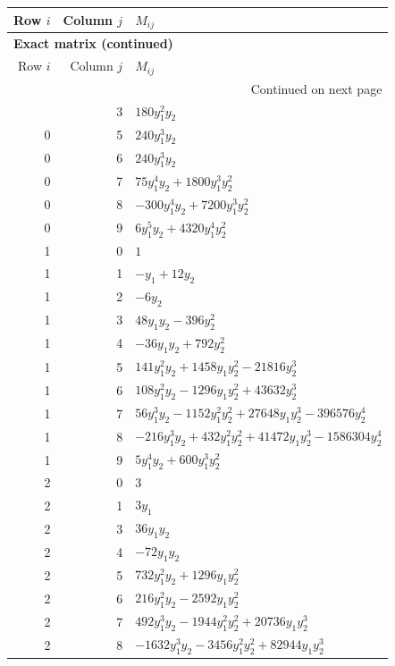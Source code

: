 \documentclass[10pt,a4paper]{article}
\begin{document}
{\small\setlength{\tabcolsep}{7pt}\begin{longtable}{rrp{125mm}}
\toprule Row $i$ & Column $j$ & $M_{ij}$\\\midrule\endfirsthead
\multicolumn{3}{l}{\textbf{Exact matrix (continued)}}\\
\toprule Row $i$ & Column $j$ & $M_{ij}$\\\midrule\endhead
\midrule\multicolumn{3}{r}{Continued on next page}\\\endfoot\bottomrule\endlastfoot
0 & 3 & $180 y_{1}^{2} y_{2}$\\
0 & 5 & $240 y_{1}^{3} y_{2}$\\
0 & 6 & $240 y_{1}^{3} y_{2}$\\
0 & 7 & $75 y_{1}^{4} y_{2} + 1800 y_{1}^{3} y_{2}^{2}$\\
0 & 8 & $- 300 y_{1}^{4} y_{2} + 7200 y_{1}^{3} y_{2}^{2}$\\
0 & 9 & $6 y_{1}^{5} y_{2} + 4320 y_{1}^{4} y_{2}^{2}$\\
1 & 0 & $1$\\
1 & 1 & $- y_{1} + 12 y_{2}$\\
1 & 2 & $- 6 y_{2}$\\
1 & 3 & $48 y_{1} y_{2} - 396 y_{2}^{2}$\\
1 & 4 & $- 36 y_{1} y_{2} + 792 y_{2}^{2}$\\
1 & 5 & $141 y_{1}^{2} y_{2} + 1458 y_{1} y_{2}^{2} - 21816 y_{2}^{3}$\\
1 & 6 & $108 y_{1}^{2} y_{2} - 1296 y_{1} y_{2}^{2} + 43632 y_{2}^{3}$\\
1 & 7 & $56 y_{1}^{3} y_{2} - 1152 y_{1}^{2} y_{2}^{2} + 27648 y_{1} y_{2}^{3} - 396576 y_{2}^{4}$\\
1 & 8 & $- 216 y_{1}^{3} y_{2} + 432 y_{1}^{2} y_{2}^{2} + 41472 y_{1} y_{2}^{3} - 1586304 y_{2}^{4}$\\
1 & 9 & $5 y_{1}^{4} y_{2} + 600 y_{1}^{3} y_{2}^{2}$\\
2 & 0 & $3$\\
2 & 1 & $3 y_{1}$\\
2 & 3 & $36 y_{1} y_{2}$\\
2 & 4 & $- 72 y_{1} y_{2}$\\
2 & 5 & $732 y_{1}^{2} y_{2} + 1296 y_{1} y_{2}^{2}$\\
2 & 6 & $216 y_{1}^{2} y_{2} - 2592 y_{1} y_{2}^{2}$\\
2 & 7 & $492 y_{1}^{3} y_{2} - 1944 y_{1}^{2} y_{2}^{2} + 20736 y_{1} y_{2}^{3}$\\
2 & 8 & $- 1632 y_{1}^{3} y_{2} - 3456 y_{1}^{2} y_{2}^{2} + 82944 y_{1} y_{2}^{3}$\\

\end{longtable}}
\end{document}
